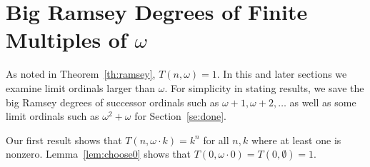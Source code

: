 \documentclass[10pt,a4paper]{article}
\newcommand{\om}{\omega}
\newcommand{\numpoints}{n}
\theoremstyle{plain}
\theoremstyle{definition}
\begin{document}
\section{Big Ramsey Degrees of Finite Multiples of \texorpdfstring{$\om$}{omega}}\label{se:aomega} 

As noted in Theorem~\ref{th:ramsey}, $T(\numpoints,\omega)=1$.
In this and later sections we examine limit ordinals larger than $\omega$.
For simplicity in stating results, we save the big
Ramsey degrees of successor ordinals such as $\om + 1, \om+2, \ldots$ as well as some limit ordinals such as $\om^2 + \om$ for 
Section~\ref{se:done}.

Our first result shows that $T(\numpoints, \omega \cdot k) = k^{\numpoints}$ for all $\numpoints,k$ where at least one is nonzero. %
Lemma~\ref{lem:choose0} shows that %
$T(0, \omega \cdot 0) = T(0, \emptyset) = 1$.
\end{document}
